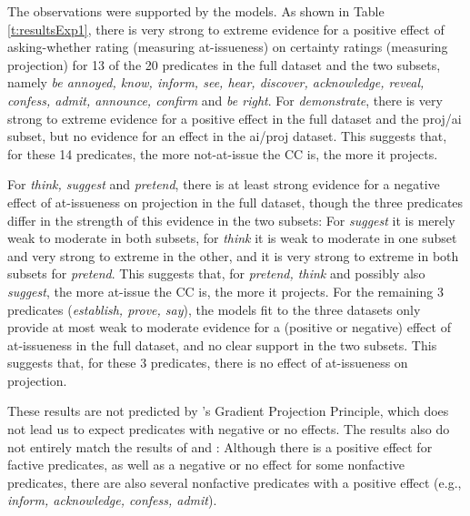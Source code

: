 \documentclass[11pt,fleqn]{article}
\newcommand{\6}{\mbox{$[\hspace*{-.6mm}[$}}
\newcommand{\9}{\mbox{$]\hspace*{-.6mm}]$}}
\newcommand{\citepos}[1]{\citeauthor{#1}'s \citeyear{#1}}
\begin{document}
The observations were supported by the models. As shown in Table \ref{t:resultsExp1}, there is very strong to extreme evidence for a positive effect of asking-whether rating (measuring at-issueness) on certainty ratings (measuring projection) for 13 of the 20 predicates in the full dataset and the two subsets, namely {\em be annoyed, know, inform, see, hear, discover, acknowledge, reveal, confess, admit, announce, confirm} and {\em be right}. For {\em demonstrate}, there is very strong to extreme evidence for a positive effect in the full dataset and the proj/ai subset, but no evidence for an effect in the ai/proj dataset. This suggests that, for these 14 predicates, the more not-at-issue the CC is, the more it projects. 

For {\em think, suggest} and {\em pretend}, there is at least strong evidence for a negative effect of at-issueness on projection in the full dataset, though the three predicates differ in the strength of this evidence in the two subsets: For {\em suggest} it is merely weak to moderate in both subsets, for {\em think} it is weak to moderate in one subset and very strong to extreme in the other, and it is very strong to extreme in both subsets for {\em pretend}. This suggests that, for {\em pretend, think} and possibly also {\em suggest}, the more at-issue the CC is, the more it projects. For the remaining 3 predicates ({\em establish, prove, say}), the models fit to the three datasets only provide at most weak to moderate evidence for a (positive or negative) effect of at-issueness in the full dataset, and no clear support in the two subsets. This suggests that, for these 3 predicates, there is no effect of at-issueness on projection.

These results are not predicted by \citepos{tbd-variability} Gradient Projection Principle, which does not lead us to expect predicates with negative or no effects. The results also do not entirely match the results of \citealt{djaerv-bacovcin-salt27,djaerv-bacovcin2020} and  \citealt{mahler-etal2020}: Although there is a positive effect for factive predicates, as well as a negative or no effect for some nonfactive predicates, there are also several nonfactive predicates with a positive effect (e.g., {\em inform, acknowledge, confess, admit}). 
\end{document}
